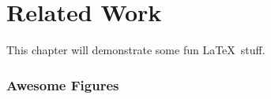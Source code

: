

\chapter{Related Work}
\label{sec:examples}
This chapter will demonstrate some fun \LaTeX\ stuff.

\subsection[Awesome Figures in the TOC]{Awesome Figures} %

